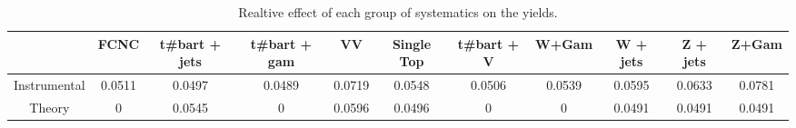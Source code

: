 \begin{table}[htbp]
\begin{center}
\begin{tabular}{|c|c|c|c|c|c|c|c|c|c|c|}
\hline 
      & FCNC      & t#bar{t} + jets      & t#bar{t} +  gam      & VV      & Single Top      & t#bar{t} + V      & W+Gam      & W + jets      & Z + jets      & Z+Gam \\ 
\hline 
 Instrumental & 0.0511 & 0.0497 & 0.0489 & 0.0719 & 0.0548 & 0.0506 & 0.0539 & 0.0595 & 0.0633 & 0.0781 \\ 
 Theory & 0 & 0.0545 & 0 & 0.0596 & 0.0496 & 0 & 0 & 0.0491 & 0.0491 & 0.0491 \\ 
\hline 
\end{tabular} 
\caption{Realtive effect of each group of systematics on the yields.} 
\end{center} 
\end{table} 
